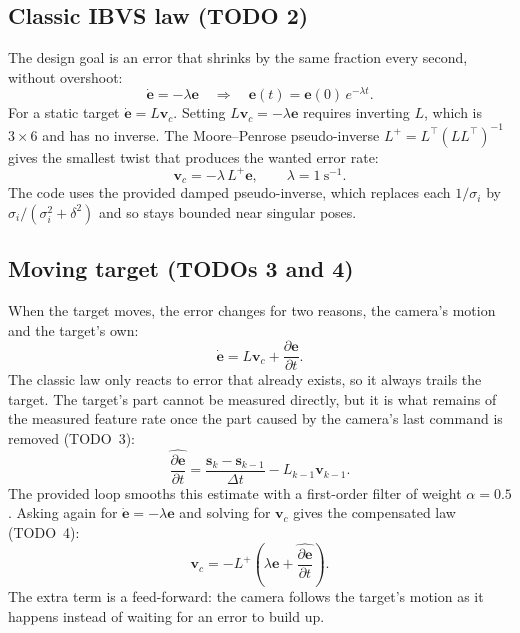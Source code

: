 \documentclass[11pt,a4paper]{article}
\newcommand{\vect}[1]{\bm{#1}}
\newcommand{\pinv}{^{+}}
\begin{document}
\subsection{Classic IBVS law (TODO 2)}

The design goal is an error that shrinks by the same fraction every second, without overshoot:
\begin{equation}
  \dot{\vect e}=-\lambda\vect e\quad\Longrightarrow\quad \vect e(t)=\vect e(0)\,e^{-\lambda t}.
\end{equation}
For a static target $\dot{\vect e}=L\vect v_c$. Setting $L\vect v_c=-\lambda\vect e$ requires inverting $L$,
which is $3\times6$ and has no inverse. The Moore--Penrose pseudo-inverse $L\pinv=L^{\top}(LL^{\top})^{-1}$
gives the smallest twist that produces the wanted error rate:
\begin{equation}\label{eq:ibvs}
  \vect v_c=-\lambda\,L\pinv\vect e,\qquad \lambda=1\ \text{s}^{-1}.
\end{equation}
The code uses the provided damped pseudo-inverse, which replaces each $1/\sigma_i$ by
$\sigma_i/(\sigma_i^{2}+\delta^{2})$ and so stays bounded near singular poses.

\subsection{Moving target (TODOs 3 and 4)}

When the target moves, the error changes for two reasons, the camera's motion and the target's own:
\begin{equation}
  \dot{\vect e}=L\vect v_c+\frac{\partial\vect e}{\partial t}.
\end{equation}
The classic law only reacts to error that already exists, so it always trails the target. The
target's part cannot be measured directly, but it is what remains of the measured feature rate once
the part caused by the camera's last command is removed (TODO~3):
\begin{equation}\label{eq:motion}
  \widehat{\frac{\partial\vect e}{\partial t}}=\frac{\vect s_k-\vect s_{k-1}}{\Delta t}-L_{k-1}\vect v_{k-1}.
\end{equation}
The provided loop smooths this estimate with a first-order filter of weight $\alpha=0.5$. Asking again
for $\dot{\vect e}=-\lambda\vect e$ and solving for $\vect v_c$ gives the compensated law (TODO~4):
\begin{equation}\label{eq:comp}
  \vect v_c=-L\pinv\!\left(\lambda\vect e+\widehat{\frac{\partial\vect e}{\partial t}}\right).
\end{equation}
The extra term is a feed-forward: the camera follows the target's motion as it happens instead of
waiting for an error to build up.
\end{document}

